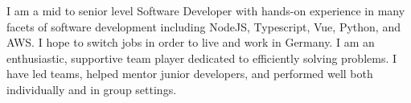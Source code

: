 
\begin{cvparagraph}
I am a mid to senior level Software Developer with hands-on experience in many facets of software development including
NodeJS, Typescript, Vue, Python, and AWS.  
I hope to switch jobs in order to live and work in Germany.
I am an enthusiastic, supportive team player dedicated to efficiently solving problems.
I have led teams, helped mentor junior developers, and performed well both individually and in group settings.
\end{cvparagraph}
